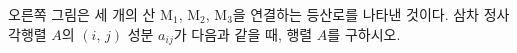 \hspace*{2mm}\begin{minipage}[t]{\dimexpr\linewidth-2mm\relax}\vspace{0pt}
\noindent\begin{minipage}[t]{0.58\linewidth}\vspace{0pt}\raggedright 오른쪽 그림은 세 개의 산 $\mathrm{M}_1$, $\mathrm{M}_2$, $\mathrm{M}_3$을 연결하는 등산로를 나타낸 것이다. 삼차 정사각행렬 $A$의 $(i,\,j)$ 성분 $a_{ij}$가 다음과 같을 때, 행렬 $A$를 구하시오. \end{minipage}\hfill\begin{minipage}[t]{0.4\linewidth}\vspace{0pt}\centering \resizebox{\ifdim\width>\linewidth\linewidth\else\width\fi}{!}{}\end{minipage}\par
\noindent {}\end{minipage}

